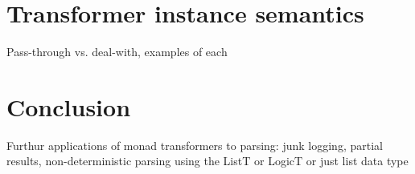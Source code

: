 \documentclass{tmr}
\begin{document}
\section{Transformer instance semantics}

Pass-through vs. deal-with, examples of each


\section{Conclusion}
Furthur applications of monad transformers to parsing:  junk logging, partial results, 
 non-deterministic parsing using the ListT or LogicT or just list data type



\end{document}
